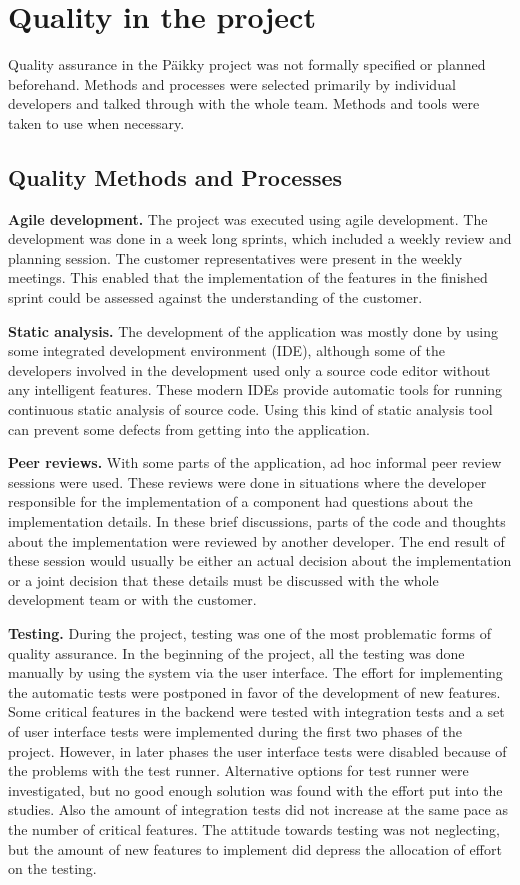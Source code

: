 
 \section{Quality in the project}

Quality assurance in the Päikky project was not formally specified or planned beforehand. Methods and processes were selected primarily by individual developers and talked through with the whole team. Methods and tools were taken to use when necessary.

\subsection{Quality Methods and Processes}

\textbf{Agile development.} The project was executed using agile development. The development was done in a week long sprints, which included a weekly review and planning session. The customer representatives were present in the weekly meetings. This enabled that the implementation of the features in the finished sprint could be assessed against the understanding of the customer. 

\textbf{Static analysis.} The development of the application was mostly done by using some integrated development environment (IDE), although some of the developers involved in the development used only a source code editor without any intelligent features. These modern IDEs provide automatic tools for running continuous static analysis of source code. Using this kind of static analysis tool can prevent some defects from getting into the application. 

\textbf{Peer reviews.} With some parts of the application, ad hoc informal peer review sessions were used. These reviews were done in situations where the developer responsible for the implementation of a component had questions about the implementation details. In these brief discussions, parts of the code and thoughts about the implementation were reviewed by another developer. The end result of these session would usually be either an actual decision about the implementation or a joint decision that these details must be discussed with the whole development team or with the customer.

\textbf{Testing.} During the project, testing was one of the most problematic forms of quality assurance. In the beginning of the project, all the testing was done manually by using the system via the user interface. The effort for implementing the automatic tests were postponed in favor of the development of new features. Some critical features in the backend were tested with integration tests and a set of user interface tests were implemented during the first two phases of the project. However, in later phases the user interface tests were disabled because of the problems with the test runner. Alternative options for test runner were investigated, but no good enough solution was found with the effort put into the studies. Also the amount of integration tests did not increase at the same pace as the number of critical features. The attitude towards testing was not neglecting, but the amount of new features to implement did depress the allocation of effort on the testing.

